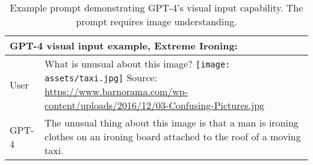 \documentclass{article}
\begin{document}
\begin{table}
\begin{tabular}[]{p{0.5in}p{4.5in}}
\toprule
\multicolumn{2}{p{5in}}{
\textbf{GPT-4 visual input example, Extreme Ironing}:}\\
\midrule
User & What is unusual about this image?\newline\newline
\texttt{[image: assets/taxi.jpg]}\newline
\scriptsize{Source: \url{https://www.barnorama.com/wp-content/uploads/2016/12/03-Confusing-Pictures.jpg}}\newline\newline
\\
GPT-4 & The unusual thing about this image is that a man is ironing clothes on an ironing board attached to the roof of a moving taxi.\\
\bottomrule
\end{tabular}
\caption{Example prompt demonstrating GPT-4's visual input capability. The prompt requires image understanding.}
\label{table:visual_input_taxi}
\end{table}
\end{document}

